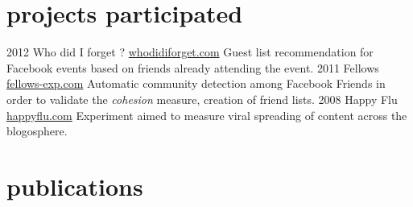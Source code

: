 \documentclass[]{friggeri-cv}
\begin{document}
\section{projects participated}

\begin{entrylist}
  \entry
    {2012}
    {Who did I forget ?}
    {\href{http://whodidiforget.com}{whodidiforget.com}}
    {Guest list recommendation for Facebook events based on friends already attending the event.}
  \entry
    {2011}
    {Fellows}
    {\href{http://fellows-exp.com}{fellows-exp.com}}
    {Automatic community detection among Facebook Friends in order to validate the \emph{cohesion} measure, creation of friend lists.}
  \entry
    {2008}
    {Happy Flu}
    {\href{http://happyflu.com}{happyflu.com}}
    {Experiment aimed to measure viral spreading of content across the blogosphere.}
\end{entrylist}

\section{publications}


\begin{refsection}
  \nocite{*}
  \printbibliography[sorting=chronological, type=inproceedings, title={international peer-reviewed conferences/proceedings}, notkeyword={france}, heading=subbibliography]
\end{refsection}
\begin{refsection}
  \nocite{*}
  \printbibliography[sorting=chronological, type=inproceedings, title={local peer-reviewed conferences/proceedings}, keyword={france}, heading=subbibliography]
\end{refsection}
\end{document}
